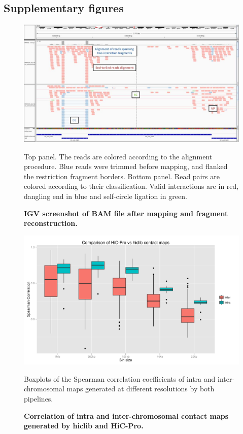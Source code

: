 \subsection*{Supplementary figures}

\begin{figure}
\includegraphics[width=\linewidth]{figures/suppfig1.png}
\caption{\bf IGV screenshot of BAM file after mapping and fragment
reconstruction.}{ Top panel. The reads are colored according to the alignment
procedure. Blue reads were trimmed before mapping, and flanked the restriction
fragment borders. Bottom panel. Read pairs are colored according to their
classification. Valid interactions are in red, dangling end in blue and
self-circle ligation in green.}
\label{suppfig:suppfig1}
\end{figure}

\begin{figure}
\includegraphics[width=\linewidth]{figures/suppfig2.png}
\caption{\bf Correlation of intra and inter-chromosomal contact maps generated
by hiclib and HiC-Pro.}{ Boxplots of the Spearman correlation coefficients of
intra and inter-chromosomal maps generated at different resolutions by both
pipelines.}
\label{suppfig:suppfig2}
\end{figure}
